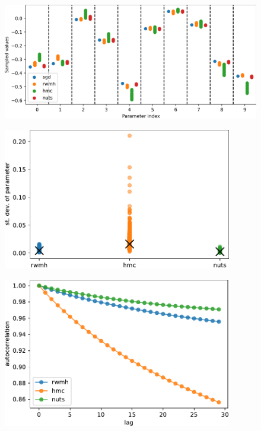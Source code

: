 \documentclass[12pt]{article}
\begin{document}
\begin{figure}[h]
\centering
\includegraphics[width=15cm]{plots/uci_param_distribution.png}
\caption{}
\label{fig_uci_param_distribution}
\end{figure}

\begin{figure}[h]
\centering
\includegraphics[width=10cm]{plots/uci_param_stdev.pdf}
\caption{}
\label{fig_uci_param_stdev}
\end{figure}

\begin{figure}[h]
\centering
\includegraphics[width=10cm]{plots/uci_param_autocor.pdf}
\caption{}
\label{fig_uci_param_autocor}
\end{figure}
\end{document}
